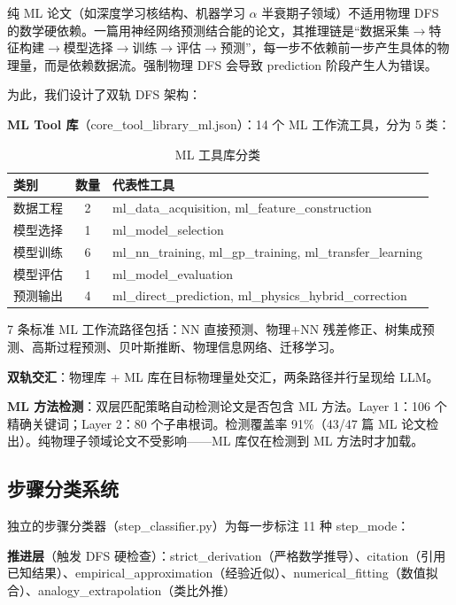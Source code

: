 \documentclass[12pt,a4paper]{article}
\begin{document}
纯 ML 论文（如深度学习核结构、机器学习 $\alpha$ 半衰期子领域）不适用物理 DFS 的数学硬依赖。一篇用神经网络预测结合能的论文，其推理链是“数据采集$\rightarrow$特征构建$\rightarrow$模型选择$\rightarrow$训练$\rightarrow$评估$\rightarrow$预测”，每一步不依赖前一步产生具体的物理量，而是依赖数据流。强制物理 DFS 会导致 prediction 阶段产生人为错误。

为此，我们设计了双轨 DFS 架构：

\textbf{ML Tool 库}（core\_tool\_library\_ml.json）：14 个 ML 工作流工具，分为 5 类：

\begin{table}[h]
\centering
\caption{ML 工具库分类}
\begin{tabular}{lcl}
\toprule
\textbf{类别} & \textbf{数量} & \textbf{代表性工具} \\
\midrule
数据工程 & 2 & ml\_data\_acquisition, ml\_feature\_construction \\
模型选择 & 1 & ml\_model\_selection \\
模型训练 & 6 & ml\_nn\_training, ml\_gp\_training, ml\_transfer\_learning \\
模型评估 & 1 & ml\_model\_evaluation \\
预测输出 & 4 & ml\_direct\_prediction, ml\_physics\_hybrid\_correction \\
\bottomrule
\end{tabular}
\end{table}

7 条标准 ML 工作流路径包括：NN 直接预测、物理+NN 残差修正、树集成预测、高斯过程预测、贝叶斯推断、物理信息网络、迁移学习。

\textbf{双轨交汇}：物理库 + ML 库在目标物理量处交汇，两条路径并行呈现给 LLM。

\textbf{ML 方法检测}：双层匹配策略自动检测论文是否包含 ML 方法。Layer 1：106 个精确关键词；Layer 2：80 个子串根词。检测覆盖率 91\%（43/47 篇 ML 论文检出）。纯物理子领域论文不受影响——ML 库仅在检测到 ML 方法时才加载。

\subsection{步骤分类系统}

独立的步骤分类器（step\_classifier.py）为每一步标注 11 种 step\_mode：

\textbf{推进层}（触发 DFS 硬检查）：strict\_derivation（严格数学推导）、citation（引用已知结果）、empirical\_approximation（经验近似）、numerical\_fitting（数值拟合）、analogy\_extrapolation（类比外推）
\end{document}
